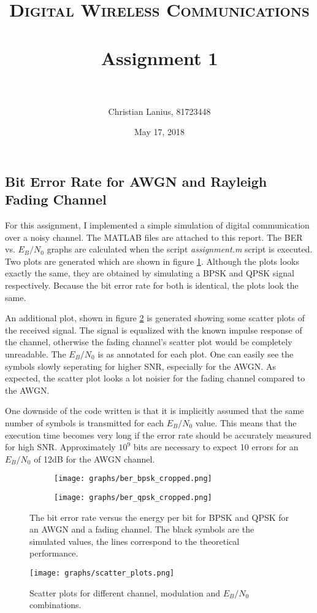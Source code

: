 \documentclass[paper=a4, fontsize=11pt]{scrartcl} %
\title{	
\normalfont \normalsize 
\textsc{Digital Wireless Communications} \\ [25pt] %
\horrule{0.5pt} \\[0.4cm] %
\huge Assignment 1 \\ %
\horrule{2pt} \\[0.5cm] %
}
\author{Christian Lanius, 81723448} %
\date{\normalsize May 17, 2018} %
\begin{document}
\maketitle %


\subsection*{Bit Error Rate for AWGN and Rayleigh Fading Channel}
For this assignment, I implemented a simple simulation of digital communication over a noisy channel. The MATLAB files are attached to this report. The BER vs. $E_B/N_0$ graphs are calculated when the script \textit{assignment.m} script is executed. Two plots are generated which are shown in figure \ref{fig:graph_ber}. Although the plots looks exactly the same, they are obtained by simulating a BPSK and QPSK signal respectively. Because the bit error rate for both is identical, the plots look the same. \par
An additional plot, shown in figure \ref{fig:graph_scatter} is generated showing some scatter plots of the received signal. The signal is equalized with the known impulse response of the channel, otherwise the fading channel's scatter plot would be completely unreadable. The $E_B/N_0$ is as annotated for each plot. One can easily see the symbols slowly seperating for higher SNR, especially for the AWGN. As expected, the scatter plot looks a lot noisier for the fading channel compared to the AWGN.\par
One downside of the code written is that it is implicitly assumed that the same number of symbols is transmitted for each $E_B/N_0$ value. This means that the execution time becomes very long if the error rate should be accurately measured for high SNR. Approximately $10^9$ bits are necessary to expect 10 errors for an $E_B/N_0$ of 12dB for the AWGN channel.\par
\begin{figure}
	\begin{subfigure}[c]{0.55\textwidth}
		
		\texttt{[image: graphs/ber\_bpsk\_cropped.png]}
		
	\end{subfigure}
	\begin{subfigure}[c]{0.55\textwidth}
		\texttt{[image: graphs/ber\_qpsk\_cropped.png]}
	\end{subfigure}
	\caption{The bit error rate versus the energy per bit for BPSK and QPSK for an AWGN and a fading channel. The black symbols are the simulated values, the lines correspond to the theoretical performance.}
	\label{fig:graph_ber}
\end{figure}

\begin{figure}
	\texttt{[image: graphs/scatter\_plots.png]}
	\caption{Scatter plots for different channel, modulation and $E_B/N_0$ combinations.}
	\label{fig:graph_scatter}
\end{figure}
\end{document}
